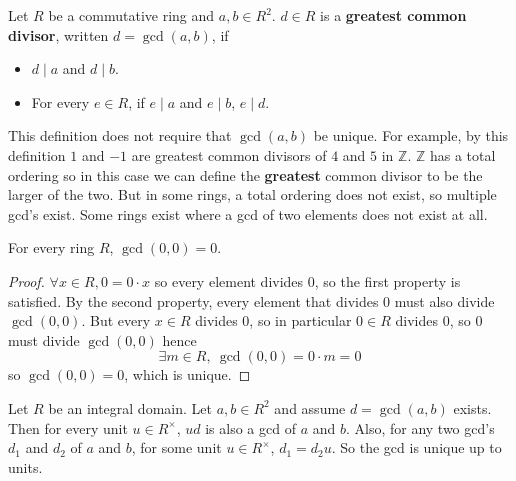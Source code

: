\begin{definition}\label{def:gcd}
	Let $R$ be a commutative ring and $a, b \in R^2$. $d \in R$ is a \textbf{greatest common divisor}, written $d = \gcd(a, b)$, if
	\begin{itemize}
		\item $d \mid a$ and $d \mid b$.
		\item For every $e \in R$, if $e \mid a$ and $e \mid b$, $e \mid d$.
	\end{itemize}
\end{definition}

\begin{remark}
	This definition does not require that $\gcd(a, b)$ be unique. For example, by this definition $1$ and $-1$ are greatest common divisors of $4$ and $5$ in $\mathbb{Z}$. $\mathbb{Z}$ has a total ordering so in this case we can define the \textbf{greatest} common divisor to be the larger of the two. But in some rings, a total ordering does not exist, so multiple gcd's exist. Some rings exist where a gcd of two elements does not exist at all.
\end{remark}

\begin{lemma}
	For every ring $R$, $\gcd(0, 0) = 0$.
\end{lemma}

\begin{proof}
	$\forall x \in R, 0 = 0 \cdot x$ so every element divides $0$, so the first property is satisfied. By the second property, every element that divides $0$ must also divide $\gcd(0, 0)$. But every $x \in R$ divides $0$, so in particular $0 \in R$ divides $0$, so $0$ must divide $\gcd(0, 0)$ hence
	\[
		\exists m \in R, \ \gcd(0, 0) = 0 \cdot m = 0
	\]
	so $\gcd(0, 0) = 0$, which is unique.
\end{proof}

\begin{lemma}\label{lem:gcdUniqueUpToUnits}
	Let $R$ be an integral domain. Let $a, b \in R^2$ and assume $d = \gcd(a, b)$ exists. Then for every unit $u \in R^{\times}$, $ud$ is also a gcd of $a$ and $b$. Also, for any two gcd's $d_1$ and $d_2$ of $a$ and $b$, for some unit $u \in R^{\times}$, $d_1 = d_2 u$. So the gcd is unique up to units.
\end{lemma}


